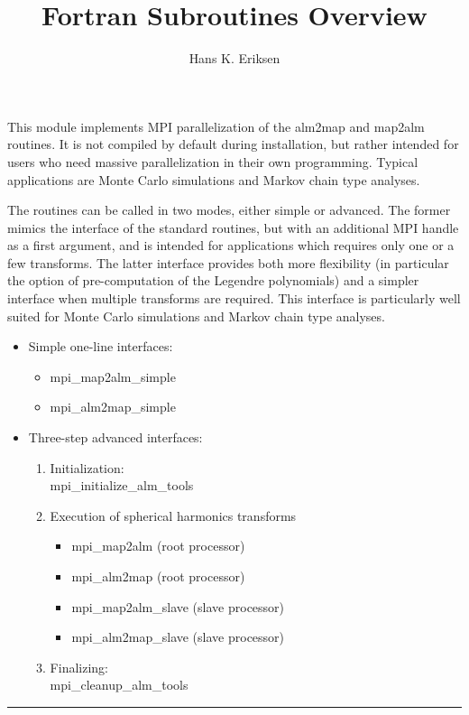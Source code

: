 
\sloppy


\title{\healpix Fortran Subroutines Overview}
 \section[mpi\_alm\_tools*]{ }
\label{sub:mpi_alm_tools}
\author{Hans K. Eriksen}

\begin{facility}
{This module implements MPI parallelization of the alm2map and map2alm routines. 
It is not compiled by default during installation, but rather intended for
users who need massive parallelization in their own programming. Typical
applications are Monte Carlo simulations and Markov chain type
analyses.

The routines can be called in two modes, either simple or
advanced. The former mimics the interface of the standard routines,
but with an additional MPI handle as a first argument, and is intended
for applications which requires only one or a few transforms. The
latter interface provides both more flexibility (in particular the
option of pre-computation of the Legendre polynomials) and a simpler
interface when multiple transforms are required. This interface is
particularly well suited for Monte Carlo simulations and Markov chain
type analyses.  } 
{\modMpiAlmTools}
\end{facility}

\begin{example}
{ 
\begin{itemize}

\item Simple one-line interfaces:
\begin{itemize}
\item mpi\_map2alm\_simple
\item mpi\_alm2map\_simple
\end{itemize}

\item Three-step advanced interfaces:
\begin{enumerate}
   \item Initialization: \\mpi\_initialize\_alm\_tools
   \item Execution of spherical harmonics transforms
   \begin{itemize}
	   \item mpi\_map2alm (root processor)
	   \item mpi\_alm2map (root processor)
	   \item mpi\_map2alm\_slave (slave processor)
	   \item mpi\_alm2map\_slave (slave processor)
    \end{itemize}
    \item Finalizing: \\ mpi\_cleanup\_alm\_tools
\end{enumerate}
\end{itemize}
}
{
}
\end{example}

\rule{\hsize}{2mm}

\newpage

